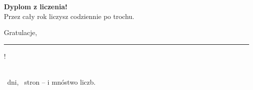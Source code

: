 \begin{center}
\vspace*{3cm}

\medalla{\totaldias}

\vspace{8mm}
{\fontsize{34}{40}\selectfont\bfseries\color{colorLectura} Dyplom z liczenia!}\\[8mm]
{\Large Przez cały rok liczysz codziennie po trochu.}\\[10mm]
{\Large Gratulacje, \rule{65mm}{0.4pt}!}\\[14mm]
{\large \totaldias\ dni, \totaldias\ stron -- i mnóstwo liczb.}
\end{center}
\vspace*{\fill}
\newpage
